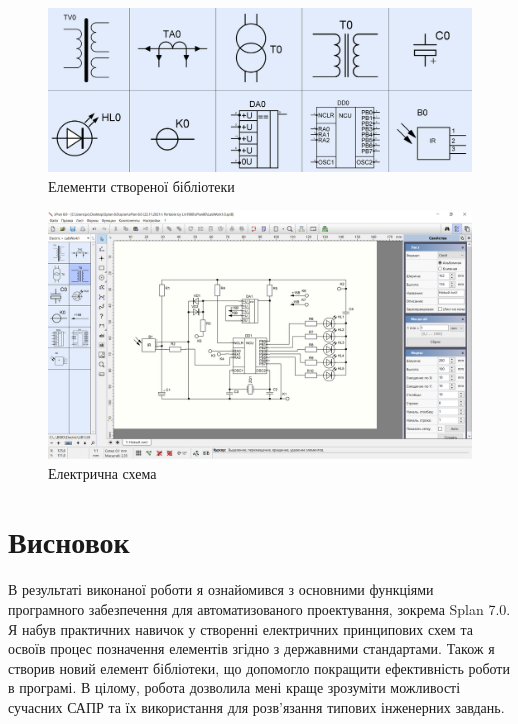 \documentclass[a4paper]{article}
\begin{document}
    \begin{figure}[h]
        \centering
        \includegraphics[width=1\textwidth]{imgs/LW1.1.png}
        \caption{Елементи створеної бібліотеки}
        \label{fig:image_label1}
    \end{figure} 

    \newpage 
 
    \begin{figure}[h]
        \centering
        \includegraphics[width=1\textwidth]{imgs/LW1.3.png}
        \caption{Електрична схема}
        \label{fig:image_label2}
    \end{figure} 

    \section*{Висновок}
    В результаті виконаної роботи я ознайомився з основними функціями програмного забезпечення 
    для автоматизованого проектування, зокрема Splan 7.0. Я набув практичних навичок у створенні 
    електричних принципових схем та освоїв процес позначення елементів згідно з державними стандартами. 
    Також я створив новий елемент бібліотеки, що допомогло покращити ефективність роботи в програмі. 
    В цілому, робота дозволила мені краще зрозуміти можливості сучасних САПР та їх використання для 
    розв'язання типових інженерних завдань.
\end{document}
